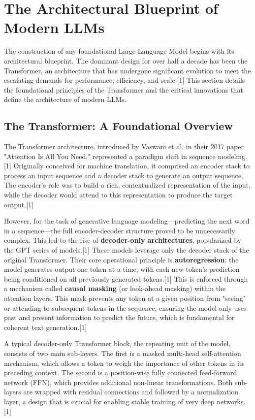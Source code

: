 \documentclass[12pt, a4paper]{article}
\begin{document}
\newpage

\section{The Architectural Blueprint of Modern LLMs}

The construction of any foundational Large Language Model begins with its architectural blueprint. The dominant design for over half a decade has been the Transformer, an architecture that has undergone significant evolution to meet the escalating demands for performance, efficiency, and scale.[1] This section details the foundational principles of the Transformer and the critical innovations that define the architecture of modern LLMs.

\subsection{The Transformer: A Foundational Overview}

The Transformer architecture, introduced by Vaswani et al. in their 2017 paper "Attention Is All You Need," represented a paradigm shift in sequence modeling.[1] Originally conceived for machine translation, it comprised an encoder stack to process an input sequence and a decoder stack to generate an output sequence. The encoder's role was to build a rich, contextualized representation of the input, while the decoder would attend to this representation to produce the target output.[1]

However, for the task of generative language modeling—predicting the next word in a sequence—the full encoder-decoder structure proved to be unnecessarily complex. This led to the rise of \textbf{decoder-only architectures}, popularized by the GPT series of models.[1] These models leverage only the decoder stack of the original Transformer. Their core operational principle is \textbf{autoregression}: the model generates output one token at a time, with each new token's prediction being conditioned on all previously generated tokens.[1] This is enforced through a mechanism called \textbf{causal masking} (or look-ahead masking) within the attention layers. This mask prevents any token at a given position from "seeing" or attending to subsequent tokens in the sequence, ensuring the model only uses past and present information to predict the future, which is fundamental for coherent text generation.[1]

A typical decoder-only Transformer block, the repeating unit of the model, consists of two main sub-layers. The first is a masked multi-head self-attention mechanism, which allows a token to weigh the importance of other tokens in its preceding context. The second is a position-wise fully connected feed-forward network (FFN), which provides additional non-linear transformations. Both sub-layers are wrapped with residual connections and followed by a normalization layer, a design that is crucial for enabling stable training of very deep networks.[1]
\end{document}
